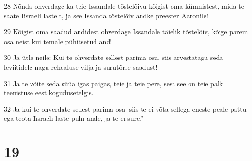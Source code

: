 \par 28 Nõnda ohverdage ka teie Issandale tõstelõivu kõigist oma kümnistest, mida te saate Iisraeli lastelt, ja see Issanda tõstelõiv andke preester Aaronile!
\par 29 Kõigist oma saadud andidest ohverdage Issandale täielik tõstelõiv, kõige parem osa neist kui temale pühitsetud and!
\par 30 Ja ütle neile: Kui te ohverdate sellest parima osa, siis arvestatagu seda leviitidele nagu rehealuse vilja ja surutõrre saadust!
\par 31 Ja te võite seda süüa igas paigas, teie ja teie pere, sest see on teie palk teenistuse eest kogudusetelgis.
\par 32 Ja kui te ohverdate sellest parima osa, siis te ei võta sellega eneste peale pattu ega teota Iisraeli laste pühi ande, ja te ei sure.”

\chapter{19}


